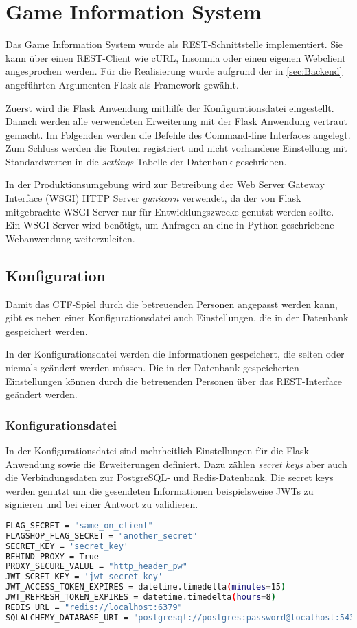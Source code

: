\section{Game Information System}
Das Game Information System wurde als REST-Schnittstelle implementiert. Sie kann über einen REST-Client wie cURL, Insomnia oder einen eigenen Webclient angesprochen werden. Für die Realisierung wurde aufgrund der in \autoref{sec:Backend} angeführten Argumenten Flask als Framework gewählt.

Zuerst wird die Flask Anwendung mithilfe der Konfigurationsdatei eingestellt. Danach werden alle verwendeten Erweiterung mit der Flask Anwendung vertraut gemacht. Im Folgenden werden die Befehle des Command-line Interfaces angelegt. Zum Schluss werden die Routen registriert und nicht vorhandene Einstellung mit Standardwerten in die \textit{settings}-Tabelle der Datenbank geschrieben.

In der Produktionsumgebung wird zur Betreibung der Web Server Gateway Interface (WSGI) HTTP Server \textit{gunicorn} verwendet, da der von Flask mitgebrachte WSGI Server nur für Entwicklungszwecke genutzt werden sollte. Ein WSGI Server wird benötigt, um Anfragen an eine in Python geschriebene Webanwendung weiterzuleiten.

\subsection{Konfiguration}
Damit das CTF-Spiel durch die betreuenden Personen angepasst werden kann, gibt es neben einer Konfigurationsdatei auch Einstellungen, die in der Datenbank gespeichert werden.

In der Konfigurationsdatei werden die Informationen gespeichert, die selten oder niemals geändert werden müssen. Die in der Datenbank gespeicherten Einstellungen können durch die betreuenden Personen über das REST-Interface geändert werden.

\subsubsection{Konfigurationsdatei}
In der Konfigurationsdatei sind mehrheitlich Einstellungen für die Flask Anwendung sowie die Erweiterungen definiert. Dazu zählen \textit{secret keys} aber auch die Verbindungsdaten zur PostgreSQL- und Redis-Datenbank. Die secret keys werden genutzt um die gesendeten Informationen beispielsweise JWTs zu signieren und bei einer Antwort zu validieren.

\begin{lstlisting}[language=bash, frame=single, caption={GIS Auszug aus der Konfiguration}, captionpos=b, label={lst:gis-config}]
FLAG_SECRET = "same_on_client"
FLAGSHOP_FLAG_SECRET = "another_secret"
SECRET_KEY = 'secret_key'
BEHIND_PROXY = True
PROXY_SECURE_VALUE = "http_header_pw"
JWT_SCRET_KEY = 'jwt_secret_key'
JWT_ACCESS_TOKEN_EXPIRES = datetime.timedelta(minutes=15)
JWT_REFRESH_TOKEN_EXPIRES = datetime.timedelta(hours=8)
REDIS_URL = "redis://localhost:6379"
SQLALCHEMY_DATABASE_URI = "postgresql://postgres:password@localhost:5432/postgres"
\end{lstlisting}

